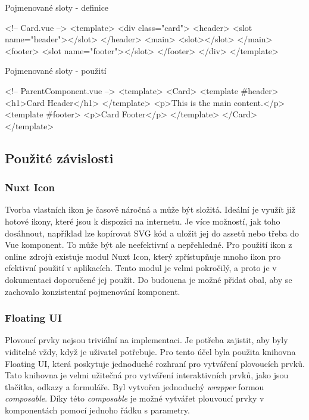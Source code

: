 \begin{listing}[h]
    \caption{Pojmenované sloty - definice}
    \label{lst:named-slots}
    \begin{code}[jsx]
<!-- Card.vue -->
<template>
  <div class="card">
    <header>
      <slot name="header"></slot>
    </header>
    <main>
      <slot></slot>
    </main>
    <footer>
      <slot name="footer"></slot>
    </footer>
  </div>
</template>
\end{code}
\end{listing}

\begin{listing}[h]
    \caption{Pojmenované sloty - použití}
    \label{lst:named-slots-usage}
    \begin{code}[html]
<!-- ParentComponent.vue -->
<template>
    <Card>
    <template #header>
        <h1>Card Header</h1>
    </template>
    <p>This is the main content.</p>
    <template #footer>
        <p>Card Footer</p>
    </template>
    </Card>
</template>
\end{code}
\end{listing}

\clearpage

\subsection{Použité závislosti}

\subsubsection{Nuxt Icon}
Tvorba vlastních ikon je časově náročná a může být složitá. Ideální je využít již hotové ikony, které jsou k dispozici na internetu. Je více možností, jak toho dosáhnout, například lze kopírovat SVG kód a uložit jej do assetů nebo třeba do Vue komponent. To může být ale neefektivní a nepřehledné. Pro použití ikon z online zdrojů existuje modul Nuxt Icon, který zpřístupňuje mnoho ikon pro efektivní použití v aplikacích. Tento modul je velmi pokročilý, a proto je v dokumentaci doporučené jej použít. Do budoucna je možné přidat obal, aby se zachovalo konzistentní pojmenování komponent.

\subsubsection{Floating UI}
Plovoucí prvky nejsou triviální na implementaci. Je potřeba zajistit, aby byly viditelné vždy, když je uživatel potřebuje. Pro tento účel byla použita knihovna Floating UI, která poskytuje jednoduché rozhraní pro vytváření plovoucích prvků. Tato knihovna je velmi užitečná pro vytváření interaktivních prvků, jako jsou tlačítka, odkazy a formuláře. Byl vytvořen jednoduchý \emph{wrapper} formou \emph{composable}. Díky této \emph{composable} je možné vytvářet plouvoucí prvky v komponentách pomocí jednoho řádku s parametry.

